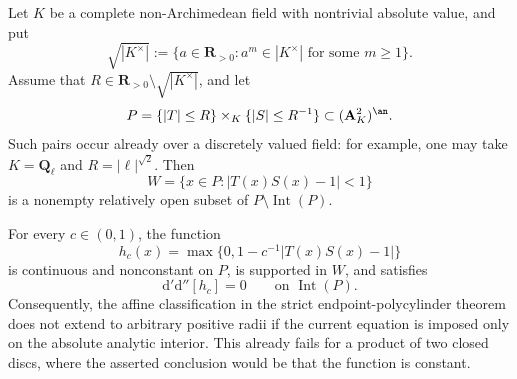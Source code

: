 
\begin{proposition}\label{prop:p062-nonstrict-boundary-resonance-counterexample}
Let \(K\) be a complete non-Archimedean field with nontrivial absolute
value, and put
\[
 \sqrt{|K^\times|}
 :=\{a\in\mathbf R_{>0}:a^m\in|K^\times|
                         \text{ for some }m\geq1\}.
\]
Assume that \(R\in\mathbf R_{>0}\setminus\sqrt{|K^\times|}\), and let
\begin{equation}\label{eq:p062-resonant-bidisc-domain}
 P=\{|T|\leq R\}\times_K\{|S|\leq R^{-1}\}
       \subset(\mathbf A^2_K)^{\an}.
\end{equation}
Such pairs occur already over a discretely valued field: for example, one
may take \(K=\mathbf Q_\ell\) and \(R=|\ell|^{\sqrt 2}\).
Then
\begin{equation}\label{eq:p062-resonant-boundary-tube}
             W=\{x\in P:|T(x)S(x)-1|<1\}
\end{equation}
is a nonempty relatively open subset of
\(P\setminus\operatorname{Int}(P)\).

For every \(c\in(0,1)\), the function
\begin{equation}\label{eq:p062-resonant-cutoff}
 h_c(x)=\max\bigl\{0,1-c^{-1}|T(x)S(x)-1|\bigr\}
\end{equation}
is continuous and nonconstant on \(P\), is supported in \(W\), and
satisfies
\begin{equation}\label{eq:p062-resonant-zero-current}
                \mathrm d'\mathrm d''[h_c]=0
                \qquad\text{on }\operatorname{Int}(P).
\end{equation}
Consequently, the affine classification in the strict endpoint-polycylinder
theorem does not extend to arbitrary positive radii if the current equation
is imposed only on the absolute analytic interior.  This already fails for
a product of two closed discs, where the asserted conclusion would be that
the function is constant.
\end{proposition}

